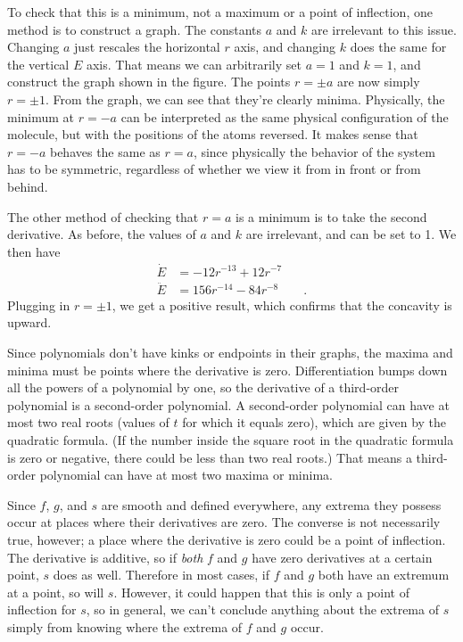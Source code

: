 To check that this is a minimum, not a maximum or a point of inflection, one method is to construct a graph. The constants
$a$ and $k$ are irrelevant to this issue. Changing $a$ just rescales the horizontal $r$ axis, and changing $k$ does the
same for the vertical $E$ axis. That means we can arbitrarily set $a=1$ and $k=1$, and construct the graph shown in the figure.
The points $r = \pm a$ are now simply $r=\pm 1$. From the graph, we can see that they're clearly minima. Physically, the
minimum at $r=-a$ can be interpreted as the same physical configuration of the molecule, but with the positions of the atoms
reversed. It makes sense that $r=-a$ behaves the same as $r=a$, since physically the behavior of the system has to be symmetric,
regardless of whether we view it from in front or from behind.


The other method of checking that $r=a$ is a minimum is to take the second derivative. As before, the values of $a$ and
$k$ are irrelevant, and can be set to 1. We then have
\begin{align*}
 \dot{E} &= -12r^{-13}+12r^{-7} \\
 \ddot{E} &= 156r^{-14}-84r^{-8}  \qquad .
\end{align*}
Plugging in $r=\pm 1$, we get a positive result, which confirms that the concavity is upward.


Since polynomials don't have kinks or endpoints in their graphs, the maxima and minima must be points where the
derivative is zero. Differentiation bumps down all the powers of a polynomial by one, so 
the derivative of a third-order polynomial is a second-order polynomial. A second-order polynomial
can have at most two real roots (values of $t$ for which it equals zero), which are given by the
quadratic formula. (If the number inside the square root in the quadratic formula is zero or negative,
there could be less than two real roots.) That means a third-order polynomial can have at most two
maxima or minima.


Since $f$, $g$, and $s$ are smooth and defined everywhere, any extrema they possess occur at places where their
derivatives are zero. The converse is not necessarily true, however; a place where the derivative is zero could
be a point of inflection. The derivative is additive, so if \emph{both} $f$ and $g$ have zero derivatives at a certain
point, $s$ does as well. Therefore in most cases, if $f$ and $g$ both have an extremum at a point, so will $s$.
However, it could happen that this is only a point of inflection for $s$, so in general, we can't conclude anything
about the extrema of $s$ simply from knowing where the extrema of $f$ and $g$ occur.

